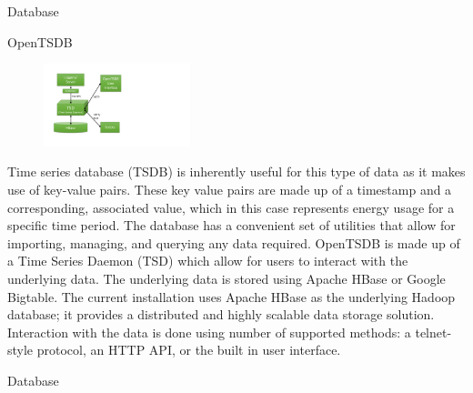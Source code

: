 \documentclass[8pt,xcolor={dvipsnames}]{beamer}
\begin{document}
{\begin{frame}{Database}
\begin{block}{OpenTSDB}
\begin{figure}
	\begin{center}
		\includegraphics[width=0.38\textwidth, trim=65 80 450 60, clip]{OpenTSDBNo}
	\end{center}
\end{figure}
	Time series database (TSDB) is inherently useful for this type of data as it makes use of key-value pairs. These key value pairs are made up of a timestamp and a corresponding, associated value, which in this case represents energy usage for a specific time period.
	The database has a convenient set of utilities that allow for importing, managing, and querying any data required. OpenTSDB is made up of a Time Series Daemon (TSD) which allow for users to interact with the underlying data. The underlying data is stored using Apache HBase or Google Bigtable. 
	The current installation uses Apache HBase as the underlying Hadoop database; it provides a distributed and  highly scalable data storage solution.
	Interaction with the data is done using number of supported methods: a telnet-style protocol, an HTTP API, or the built in user interface.
	
	
\end{block}

\end{frame}

\begin{frame}{Database}


\end{frame}}
\end{document}

